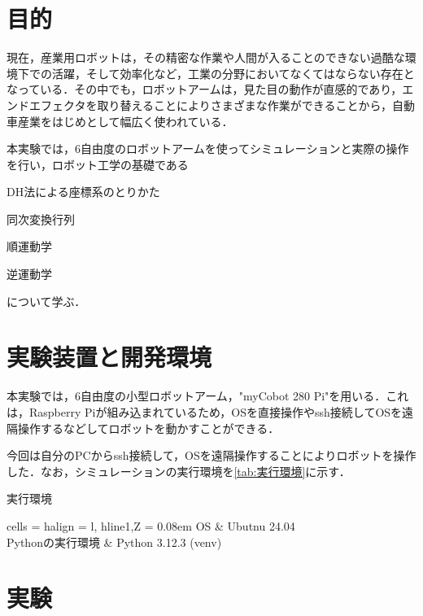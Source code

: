 \documentclass{ltjsarticle}
\begin{document}
\setcounter{page}{1}

\section{目的}
現在，産業用ロボットは，その精密な作業や人間が入ることのできない過酷な環境下での活躍，そして効率化など，工業の分野においてなくてはならない存在となっている．その中でも，ロボットアームは，見た目の動作が直感的であり，エンドエフェクタを取り替えることによりさまざまな作業ができることから，自動車産業をはじめとして幅広く使われている．

本実験では，6自由度のロボットアームを使ってシミュレーションと実際の操作を行い，ロボット工学の基礎である
\begin{enumerate*}
	\item DH法による座標系のとりかた
	\item 同次変換行列
	\item 順運動学
	\item 逆運動学
\end{enumerate*}
について学ぶ．

\section{実験装置と開発環境}
本実験では，6自由度の小型ロボットアーム，"myCobot 280 Pi"を用いる．これは，Raspberry Piが組み込まれているため，OSを直接操作やssh接続してOSを遠隔操作するなどしてロボットを動かすことができる．

今回は自分のPCからssh接続して，OSを遠隔操作することによりロボットを操作した．なお，シミュレーションの実行環境を\cref{tab:実行環境}に示す．
\begin{table}[H]
	\centering
	\caption{実行環境}
	\label{tab:実行環境}
	\begin{tblr}{
		cells = {halign = l},
		hline{1,Z} = {0.08em}
	}
		OS & Ubutnu 24.04 \\
		Pythonの実行環境 & Python 3.12.3 (venv)
	\end{tblr}
\end{table}

\section{実験}
\end{document}
